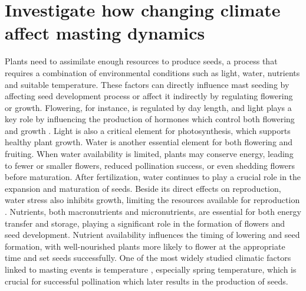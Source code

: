 \documentclass[11pt,letter]{article}
\begin{document}
\section{Investigate how changing climate affect masting dynamics}
Plants need to assimilate enough resources to produce seeds, a process that requires a combination of environmental conditions such as light, water, nutrients and suitable temperature. These factors can directly influence mast seeding by affecting seed development process or affect it indirectly by regulating flowering or growth. Flowering, for instance, is regulated by day length, and light plays a key role by influencing the production of hormones which control both flowering and growth \citep{lau2010plant}. Light is also a critical element for photosynthesis, which supports healthy plant growth. Water is another essential element for both flowering and fruiting. When water availability is limited, plants may conserve energy, leading to fewer or smaller flowers, reduced pollination success, or even shedding flowers before maturation. After fertilization, water continues to play a crucial role in the expansion and maturation of seeds. Beside its direct effects on reproduction, water stress also inhibits growth, limiting the resources available for reproduction \citep{hsiao1973plant, anjum2011morphological}. Nutrients, both macronutrients and micronutrients, are essential for both energy transfer and storage, playing a significant role in the formation of flowers and seed development. Nutrient availability influences the timing of lowering and seed formation, with well-nourished plants more likely to flower at the appropriate time and set seeds successfully. One of the most widely studied climatic factors linked to masting events is temperature \citep{bajocco2021characterizing, moreira2015effects, schauber2002masting, bogdziewicz2024evolutionary}, especially spring temperature, which is crucial for successful pollination which later results in the production of seeds.\par
\end{document}
